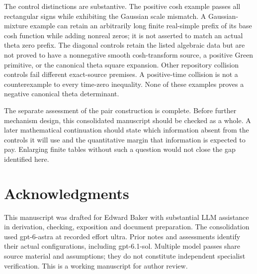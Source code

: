 \documentclass[11pt]{article}
\theoremstyle{remark}
\begin{document}
The control distinctions are substantive. The positive cosh example
passes all rectangular signs while exhibiting the Gaussian scale
mismatch. A Gaussian-mixture example can retain an arbitrarily long finite
real-simple prefix of its base cosh function while adding nonreal zeros;
it is not asserted to match an actual theta zero prefix. The diagonal controls
retain the listed algebraic data but are not proved to have a nonnegative
smooth cosh-transform source, a positive Green primitive, or the canonical
theta square expansion. Other repository collision controls fail different
exact-source premises. A positive-time collision is not a counterexample
to every time-zero inequality. None of these examples proves a negative
canonical theta determinant.

The separate assessment of the pair construction is complete. Before
further mechanism design, this consolidated manuscript should be checked
as a whole. A later mathematical continuation should state which
information absent from the controls it will use and the quantitative
margin that information is expected to pay. Enlarging finite tables
without such a question would not close the gap identified here.

\appendix



\clearpage
\section*{Acknowledgments}
This manuscript was drafted for Edward Baker with substantial LLM
assistance in derivation, checking, exposition and document preparation.
The consolidation used gpt-6-astra at recorded effort ultra. Prior notes
and assessments identify their actual configurations, including
gpt-6.1-sol. Multiple model passes share source material and assumptions;
they do not constitute independent specialist verification. This is a working
manuscript for author review.


\begingroup
\small

\endgroup
\end{document}
